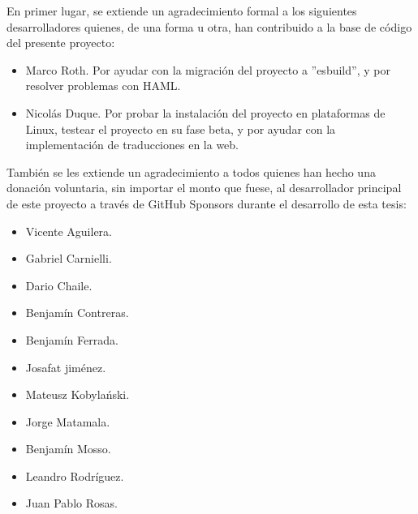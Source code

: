 En primer lugar, se extiende un agradecimiento formal a los siguientes desarrolladores quienes, de una forma u otra, han contribuido a la base de código del presente proyecto:
\begin{itemize}
	\item Marco Roth. Por ayudar con la migración del proyecto a ''esbuild'', y por resolver problemas con HAML.
	\item Nicolás Duque. Por probar la instalación del proyecto en plataformas de Linux, testear el proyecto en su fase beta, y por ayudar con la implementación de traducciones en la web.
\end{itemize}

También se les extiende un agradecimiento a todos quienes han hecho una donación voluntaria, sin importar el monto que fuese, al desarrollador principal de este proyecto a través de GitHub Sponsors durante el desarrollo de esta tesis:
\begin{itemize}
	\item Vicente Aguilera.
	\item Gabriel Carnielli.
	\item Dario Chaile.
	\item Benjamín Contreras.
	\item Benjamín Ferrada.
	\item Josafat jiménez.
	\item  Mateusz Kobylański.
	\item Jorge Matamala.
	\item Benjamín Mosso.
	\item Leandro Rodríguez.
	\item Juan Pablo Rosas.
\end{itemize}
